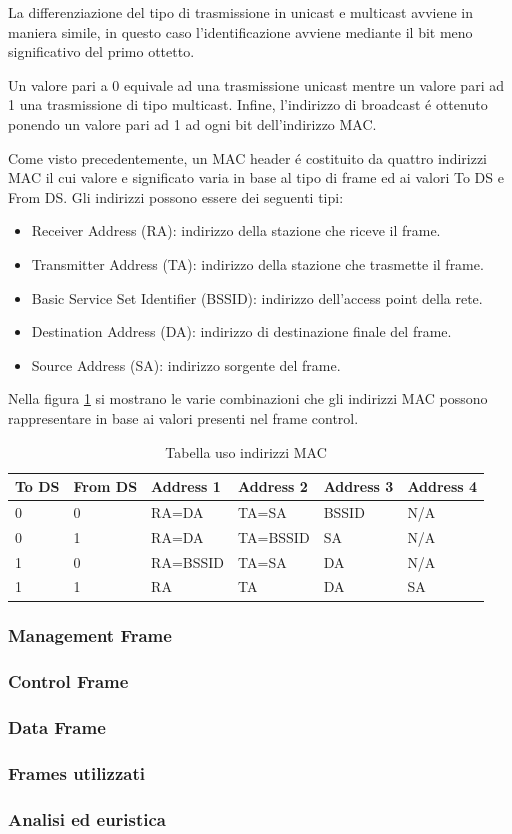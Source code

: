 La differenziazione del tipo di trasmissione in unicast e multicast avviene in maniera simile, in questo caso l'identificazione avviene mediante il bit meno significativo del primo ottetto.

Un valore pari a 0 equivale ad una trasmissione unicast mentre un valore pari ad 1 una trasmissione di tipo multicast.
Infine, l'indirizzo di broadcast \'e ottenuto ponendo un valore pari ad 1 ad ogni bit dell'indirizzo MAC.

Come visto precedentemente, un MAC header \'e costituito da quattro indirizzi MAC il cui valore e significato varia in base al tipo di frame ed ai valori To DS e From DS.
Gli indirizzi possono essere dei seguenti tipi:
\begin{itemize}
	\item Receiver Address (RA): indirizzo della stazione che riceve il frame.
	\item Transmitter Address (TA): indirizzo della stazione che trasmette il frame.
	\item Basic Service Set Identifier (BSSID): indirizzo dell'access point della rete.
	\item Destination Address (DA): indirizzo di destinazione finale del frame.
	\item Source Address (SA): indirizzo sorgente del frame.
\end{itemize}

Nella figura \ref{table:addressvalue} si mostrano le varie combinazioni che gli indirizzi MAC possono rappresentare in base ai valori presenti nel frame control.

\begin{table}[h]
\centering
\begin{tabular}{| l | l | l | l | l | l |}
	\hline 
	To DS  & From DS & Address 1 & Address 2 & Address 3 & Address 4\\ \hline
	 0 & 0 & RA=DA & TA=SA & BSSID & N/A \\ \hline
     0 & 1 & RA=DA & TA=BSSID & SA & N/A\\ \hline
	 1 & 0 & RA=BSSID & TA=SA & DA & N/A\\ \hline
	 1 & 1 & RA & TA & DA & SA\\ \hline
\end{tabular}
\centering
\caption{Tabella uso indirizzi MAC }
\label{table:addressvalue}
\end{table}


\newpage

\subsubsection{Management Frame}
\subsubsection{Control Frame}
\subsubsection{Data Frame}
\subsubsection{Frames utilizzati}
\subsubsection{Analisi ed euristica}
